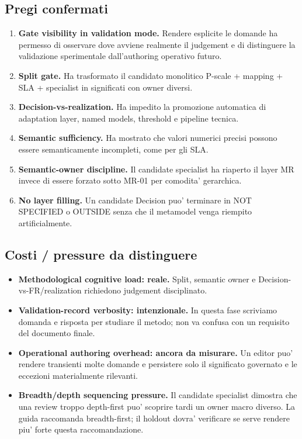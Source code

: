 \documentclass[11pt,a4paper]{article}
\begin{document}
\subsection{Pregi confermati}
\begin{enumerate}
  \item \textbf{Gate visibility in validation mode.} Rendere esplicite le domande ha permesso di osservare dove avviene realmente il judgement e di distinguere la validazione sperimentale dall'authoring operativo futuro.
  \item \textbf{Split gate.} Ha trasformato il candidato monolitico P-scale + mapping + SLA + specialist in significati con owner diversi.
  \item \textbf{Decision-vs-realization.} Ha impedito la promozione automatica di adaptation layer, named models, threshold e pipeline tecnica.
  \item \textbf{Semantic sufficiency.} Ha mostrato che valori numerici precisi possono essere semanticamente incompleti, come per gli SLA.
  \item \textbf{Semantic-owner discipline.} Il candidate specialist ha riaperto il layer MR invece di essere forzato sotto MR-01 per comodita' gerarchica.
  \item \textbf{No layer filling.} Un candidate Decision puo' terminare in NOT SPECIFIED o OUTSIDE senza che il metamodel venga riempito artificialmente.
\end{enumerate}

\subsection{Costi / pressure da distinguere}
\begin{itemize}
  \item \textbf{Methodological cognitive load: reale.} Split, semantic owner e Decision-vs-FR/realization richiedono judgement disciplinato.
  \item \textbf{Validation-record verbosity: intenzionale.} In questa fase scriviamo domanda e risposta per studiare il metodo; non va confusa con un requisito del documento finale.
  \item \textbf{Operational authoring overhead: ancora da misurare.} Un editor puo' rendere transienti molte domande e persistere solo il significato governato e le eccezioni materialmente rilevanti.
  \item \textbf{Breadth/depth sequencing pressure.} Il candidate specialist dimostra che una review troppo depth-first puo' scoprire tardi un owner macro diverso. La guida raccomanda breadth-first; il holdout dovra' verificare se serve rendere piu' forte questa raccomandazione.
\end{itemize}
\end{document}
